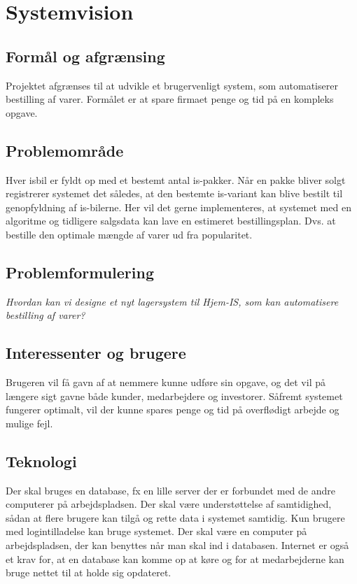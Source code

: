 \chapter{Systemvision}\label{ch:systemvision}

\section{Formål og afgrænsing}
Projektet afgrænses til at udvikle et brugervenligt system, som automatiserer bestilling af varer. 
Formålet er at spare firmaet penge og tid på en kompleks opgave.

\section{Problemområde}
Hver isbil er fyldt op med et bestemt antal is-pakker. Når en pakke bliver solgt registrerer systemet det således, at den bestemte is-variant kan blive bestilt til genopfyldning af is-bilerne. Her vil det gerne implementeres, at systemet med en algoritme og tidligere salgsdata kan lave en estimeret bestillingsplan. Dvs. at bestille den optimale mængde af varer ud fra popularitet. 

\section{Problemformulering}
\textit{Hvordan kan vi designe et nyt lagersystem til Hjem-IS, som kan automatisere bestilling af varer?}

\section{Interessenter og brugere}
Brugeren vil få gavn af at nemmere kunne udføre sin opgave, og det vil på længere sigt gavne både kunder, medarbejdere og investorer. Såfremt systemet fungerer optimalt, vil der kunne spares penge og tid på overflødigt arbejde og mulige fejl.

\section{Teknologi}
Der skal bruges en database, fx en lille server der er forbundet med de andre computerer på arbejdspladsen. Der skal være understøttelse af samtidighed, sådan at flere brugere kan tilgå og rette data i systemet samtidig. Kun brugere med logintilladelse kan bruge systemet. Der skal være en computer på arbejdspladsen, der kan benyttes når man skal ind i databasen. Internet er også et krav for, at en database kan komme op at køre og for at medarbejderne kan bruge nettet til at holde sig opdateret.


